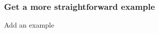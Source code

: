 \documentclass[main.tex]{subfiles}
\begin{document}
 \subsubsection{Get a more straightforward example} Add an example





    
  

\end{document}
